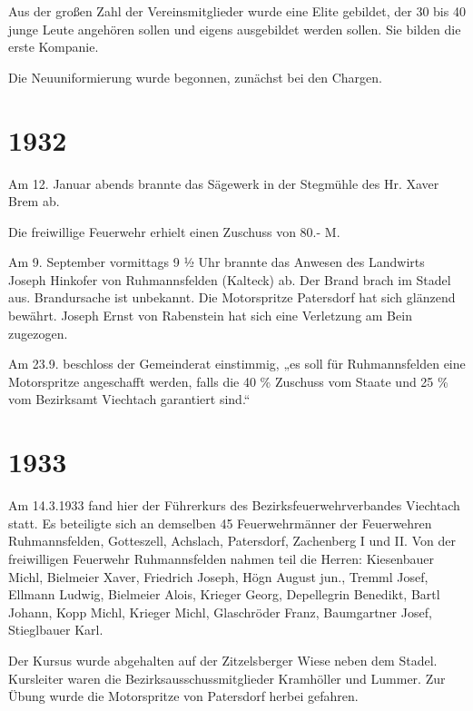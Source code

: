 \documentclass[12pt,a4paper]{book}
\begin{document}
Aus der großen Zahl der Vereinsmitglieder wurde eine Elite gebildet, der 30 bis
40 junge Leute angehören sollen und eigens ausgebildet werden sollen. Sie bilden
die erste Kompanie.

Die Neuuniformierung wurde begonnen, zunächst bei den Chargen.

\section*{1932}

Am 12. Januar abends brannte das Sägewerk in der Stegmühle des Hr. Xaver Brem
ab.

Die freiwillige Feuerwehr erhielt einen Zuschuss von 80.- M.

Am 9. September vormittags 9 ½ Uhr brannte das Anwesen des Landwirts Joseph
Hinkofer von Ruhmannsfelden (Kalteck) ab. Der Brand brach im Stadel aus.
Brandursache ist unbekannt. Die Motorspritze Patersdorf hat sich glänzend
bewährt. Joseph Ernst von Rabenstein hat sich eine Verletzung am Bein zugezogen.

Am 23.9. beschloss der Gemeinderat einstimmig, „es soll für Ruhmannsfelden eine
Motorspritze angeschafft werden, falls die 40 \% Zuschuss vom Staate und 25 \% vom
Bezirksamt Viechtach garantiert sind.“

\section*{1933}

Am 14.3.1933 fand hier der Führerkurs des Bezirksfeuerwehrverbandes Viechtach
statt. Es beteiligte sich an demselben 45 Feuerwehrmänner der Feuerwehren
Ruhmannsfelden, Gotteszell, Achslach, Patersdorf, Zachenberg I und II. Von der
freiwilligen Feuerwehr Ruhmannsfelden nahmen teil die Herren: Kiesenbauer Michl,
Bielmeier Xaver, Friedrich Joseph, Högn August jun., Tremml Josef, Ellmann
Ludwig, Bielmeier Alois, Krieger Georg, Depellegrin Benedikt, Bartl Johann, Kopp
Michl, Krieger Michl, Glaschröder Franz, Baumgartner Josef, Stieglbauer Karl.

    Der Kursus wurde abgehalten auf der Zitzelsberger Wiese neben dem Stadel.
    Kursleiter waren die Bezirksausschussmitglieder Kramhöller und Lummer. Zur
    Übung wurde die Motorspritze von Patersdorf herbei gefahren.
\end{document}
